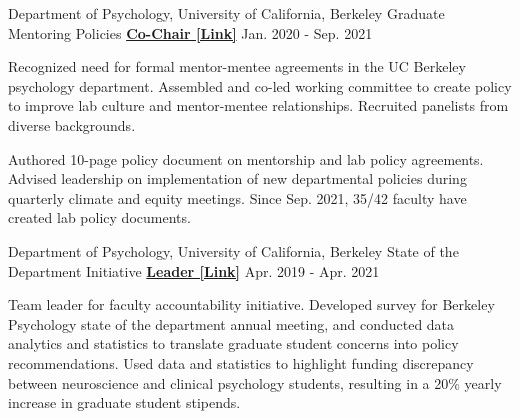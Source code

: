 \begin{cventries}
  \cventry 
    {Department of Psychology, University of California, Berkeley} %
    {Graduate Mentoring Policies}
    {\href{http://ivrylab.berkeley.edu/uploads/4/1/1/5/41152143/cognac_lab_policies_19feb2021.pdf}{\textbf{Co-Chair [Link]}}} %
    {Jan. 2020 - Sep. 2021} %
    {
      \begin{cvitems} %
        \item {Recognized need for formal mentor-mentee agreements in the UC Berkeley psychology department. Assembled and co-led working committee to create policy to improve lab culture and mentor-mentee relationships. Recruited panelists from diverse backgrounds.}
        \item {Authored 10-page policy document on mentorship and lab policy agreements. Advised leadership on implementation of new departmental policies during quarterly climate and equity meetings. Since Sep. 2021, 35/42 faculty have created lab policy documents.}
      \end{cvitems}
    }
    
    
  \cventry 
    {Department of Psychology, University of California, Berkeley} %
    {State of the Department Initiative}
    {\href{https://drive.google.com/file/d/1wD7y5gW39EU4vQUyhcrO7Fra1Ttc_HyG/view?usp=sharing}{\textbf{Leader [Link]}}} %
    {Apr. 2019 - Apr. 2021} %
    {
      \begin{cvitems} %
      	\item {Team leader for faculty accountability initiative. Developed survey for Berkeley Psychology state of the department annual meeting, and conducted data analytics and statistics to translate graduate student concerns into policy recommendations. Used data and statistics to highlight funding discrepancy between neuroscience and clinical psychology students, resulting in a 20\% yearly increase in graduate student stipends.}
      \end{cvitems}
    }
 
\end{cventries}
